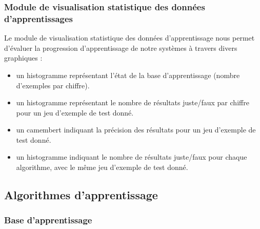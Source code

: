 \documentclass[10pt,a4paper]{report}
\begin{document}
\subsubsection{Module de visualisation statistique des données d'apprentissages}
\begin{flushleft}

Le module de visualisation statistique des données d'apprentissage nous permet d'évaluer la progression d'apprentissage de notre systèmes à travers divers graphiques :

\begin{itemize}[label=$-$,leftmargin=*,parsep=0cm,itemsep=0.1cm,topsep=0cm]

\item un histogramme représentant l'état de la base d'apprentissage (nombre d'exemples par chiffre).

\item un histogramme représentant le nombre de résultats juste/faux par chiffre pour un jeu d'exemple de test donné.

\item un camembert indiquant la précision des résultats pour un jeu d'exemple de test donné.

\item un histogramme indiquant le nombre de résultats juste/faux pour chaque algorithme, avec le même jeu d'exemple de test donné.

\end{itemize}

\end{flushleft}

\subsection{Algorithmes d'apprentissage}

\subsubsection{Base d'apprentissage}
\end{document}
